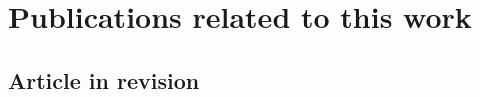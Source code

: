 % 
% 
% 
% 

\newpage
\chapter*{Publications related to this work}


\section*{Article in revision}
